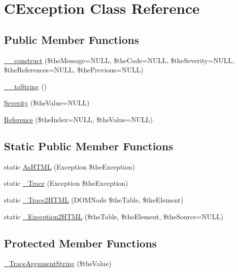 \hypertarget{class_c_exception}{\section{C\-Exception Class Reference}
\label{class_c_exception}
}
\subsection*{Public Member Functions}
\begin{DoxyCompactItemize}
\item 
\hyperlink{class_c_exception_aea9f2ae76b6058652dfb672ce1a78507}{\-\_\-\-\_\-construct} (\$the\-Message=N\-U\-L\-L, \$the\-Code=N\-U\-L\-L, \$the\-Severity=N\-U\-L\-L, \$the\-References=N\-U\-L\-L, \$the\-Previous=N\-U\-L\-L)
\item 
\hyperlink{class_c_exception_a06b1b207799f8a8ca27bc12d1be82b07}{\-\_\-\-\_\-to\-String} ()
\item 
\hyperlink{class_c_exception_a2bef90da8a35e80dda8072d4f748ec20}{Severity} (\$the\-Value=N\-U\-L\-L)
\item 
\hyperlink{class_c_exception_abcbd46a262790fcbe3493e30a6418821}{Reference} (\$the\-Index=N\-U\-L\-L, \$the\-Value=N\-U\-L\-L)
\end{DoxyCompactItemize}
\subsection*{Static Public Member Functions}
\begin{DoxyCompactItemize}
\item 
static \hyperlink{class_c_exception_a99be238dee92094374995eebe54df6a8}{As\-H\-T\-M\-L} (Exception \$the\-Exception)
\item 
static \hyperlink{class_c_exception_ad5f92d9c5d11443ce4b69aec6a8484d5}{\-\_\-\-Trace} (Exception \$the\-Exception)
\item 
static \hyperlink{class_c_exception_a643b0ad0d3d4faba071968c953d639af}{\-\_\-\-Trace2\-H\-T\-M\-L} (D\-O\-M\-Node \$the\-Table, \$the\-Element)
\item 
static \hyperlink{class_c_exception_a84a97fbcc2907c16a29a01adf841ee94}{\-\_\-\-Exception2\-H\-T\-M\-L} (\$the\-Table, \$the\-Element, \$the\-Source=N\-U\-L\-L)
\end{DoxyCompactItemize}
\subsection*{Protected Member Functions}
\begin{DoxyCompactItemize}
\item 
\hyperlink{class_c_exception_a2fb444dcf37f658f1f5dc696ed35dd7d}{\-\_\-\-Trace\-Argument\-String} (\$the\-Value)
\end{DoxyCompactItemize}
